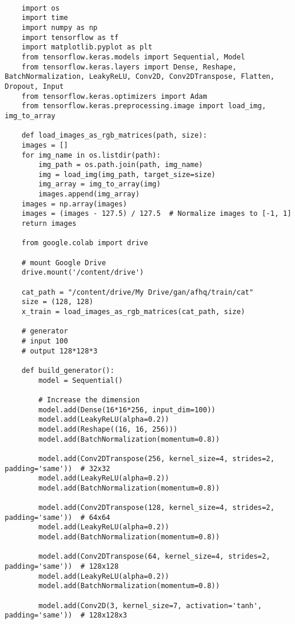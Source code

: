 \begin{lstlisting}[style=mypython, caption=Apply Animal Faces-HQ Dataset]

    import os
    import time
    import numpy as np
    import tensorflow as tf
    import matplotlib.pyplot as plt
    from tensorflow.keras.models import Sequential, Model
    from tensorflow.keras.layers import Dense, Reshape, BatchNormalization, LeakyReLU, Conv2D, Conv2DTranspose, Flatten, Dropout, Input
    from tensorflow.keras.optimizers import Adam
    from tensorflow.keras.preprocessing.image import load_img, img_to_array

    def load_images_as_rgb_matrices(path, size):
    images = []
    for img_name in os.listdir(path):
        img_path = os.path.join(path, img_name)
        img = load_img(img_path, target_size=size)
        img_array = img_to_array(img)
        images.append(img_array)
    images = np.array(images)
    images = (images - 127.5) / 127.5  # Normalize images to [-1, 1]
    return images

    from google.colab import drive

    # mount Google Drive
    drive.mount('/content/drive')

    cat_path = "/content/drive/My Drive/gan/afhq/train/cat"
    size = (128, 128)
    x_train = load_images_as_rgb_matrices(cat_path, size)

    # generator
    # input 100
    # output 128*128*3

    def build_generator():
        model = Sequential()

        # Increase the dimension
        model.add(Dense(16*16*256, input_dim=100))
        model.add(LeakyReLU(alpha=0.2))
        model.add(Reshape((16, 16, 256)))
        model.add(BatchNormalization(momentum=0.8))

        model.add(Conv2DTranspose(256, kernel_size=4, strides=2, padding='same'))  # 32x32
        model.add(LeakyReLU(alpha=0.2))
        model.add(BatchNormalization(momentum=0.8))

        model.add(Conv2DTranspose(128, kernel_size=4, strides=2, padding='same'))  # 64x64
        model.add(LeakyReLU(alpha=0.2))
        model.add(BatchNormalization(momentum=0.8))

        model.add(Conv2DTranspose(64, kernel_size=4, strides=2, padding='same'))  # 128x128
        model.add(LeakyReLU(alpha=0.2))
        model.add(BatchNormalization(momentum=0.8))

        model.add(Conv2D(3, kernel_size=7, activation='tanh', padding='same'))  # 128x128x3


\end{lstlisting}
